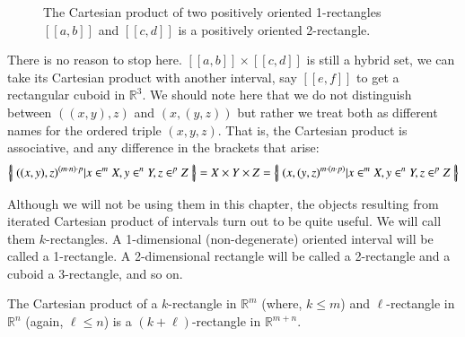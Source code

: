 \begin{figure}[ht]
\caption[Cartesian product of two 1-rectangles]{The Cartesian product of two positively oriented 1-rectangles $[\![a,b]\!]$ and $[\![c,d]\!]$ is a positively oriented 2-rectangle.}
\centering
{}
\end{figure}


There is no reason to stop here.
$[\![a,b]\!]\times [\![c,d]\!]$ is still a hybrid set, we can take its Cartesian product with another interval, say $[\![e,f]\!]$
to get a rectangular cuboid in $\mathbb{R}^3$.
We should note here that we do not distinguish between $((x,y),z)$ and $(x,(y,z))$
 but rather we treat both as different names for the ordered triple $(x,y,z)$.
That is, the Cartesian product is associative, and any difference in the brackets that arise:
\begin{equation*}
	\left\{ \! \left| \;  ((x, y), z)^{(m \cdot n)\cdot p} | x \in^m X, y \in^n Y, z \in^p Z  \; \right| \! \right\}
	= X \times Y \times Z
	= \left\{ \! \left| \;  (x, (y, z)^{m \cdot (n\cdot p)} |  x \in^m X, y \in^n Y, z \in^p Z  \; \right| \! \right\}
\end{equation*}
 
 
Although we will not be using them in this chapter, the objects resulting from iterated Cartesian product of intervals 
turn out to be quite useful.
We will call them $k$-rectangles.
A 1-dimensional (non-degenerate) oriented interval will be called a 1-rectangle.
A 2-dimensional rectangle will be called a 2-rectangle and a cuboid a 3-rectangle, and so on.

\begin{theorem}
	The Cartesian product of a $k$-rectangle in $\mathbb{R}^m$ (where, $k\leq m$) 
	and $\ell$-rectangle in $\mathbb{R}^n$ (again, $\ell \leq n$) 
	is a $(k+\ell)$-rectangle in $\mathbb{R}^{m+n}$.
\end{theorem}



